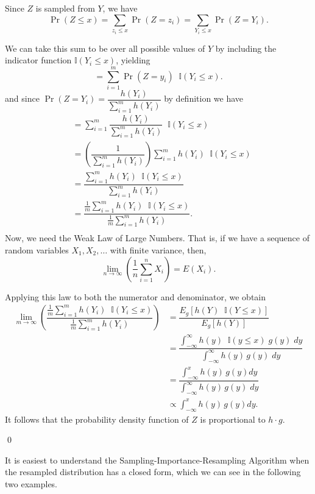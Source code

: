 \documentclass[12pt,twoside]{smiththesis}
\begin{document}
Since \(Z\) is sampled from \(Y\), we have
\[ \Pr(Z \leq x ) = \sum_{z_i \leq x} \Pr(Z=z_i) = \sum_{Y_i \leq x} \Pr(Z=Y_i) .\]

We can take this sum to be over all possible values of \(Y\) by including the indicator function \(\mathbb{I} (Y_i \leq x)\), yielding
\[  = \sum_{i = 1}^m \Pr(Z=y_i)\;\;\mathbb{I} (Y_i \leq x).  \]
and since \(\Pr(Z=Y_i) = \dfrac{h(Y_i)}{\sum_{i=1}^mh(Y_i) }\) by definition we have
\begin{align*} 
&= \sum_{i = 1}^m \dfrac{h(Y_i)}{\sum_{i=1}^mh(Y_i) }  \;\;\mathbb{I} (Y_i \leq x)   \\
&=  \left( \dfrac{1}{ {\sum_{i=1}^mh(Y_i) }} \right) {\sum_{i=1}^mh(Y_i) }  \;\;\mathbb{I} (Y_i \leq x)   \\
&=   \dfrac{ {\sum_{i=1}^mh(Y_i) }  \;\;\mathbb{I} (Y_i \leq x) }{\sum_{i=1}^mh(Y_i) } \\
&=   \dfrac{ \frac 1m {\sum_{i=1}^mh(Y_i) }  \;\;\mathbb{I} (Y_i \leq x) }{\frac 1m \sum_{i=1}^mh(Y_i) }. \\
\end{align*}
Now, we need the Weak Law of Large Numbers. That is, if we have a sequence of random variables \(X_1, X_2, \dots\) with finite variance, then,
\[ \lim_{n \to \infty} \left( \frac{1}{n} \sum_{i=1}^n X_i \right)  = E(X_i). \]

Applying this law to both the numerator and denominator, we obtain
\begin{align*}  \lim_{m \to \infty} \left( \dfrac{ \frac 1m {\sum_{i=1}^mh(Y_i) }  \;\;\mathbb{I} (Y_i \leq x) }{\frac 1m \sum_{i=1}^mh(Y_i) } \right) &= \dfrac{ E_g[ h(Y) \;\; \mathbb I (Y \leq x) ]  }{ E_g[ h(Y) ]  }\\
&= \dfrac{\int_{-\infty}^\infty h(y) \;\; \mathbb I (y \leq x) \; g(y) \; dy}{\int_{-\infty}^\infty h(y) \, g(y) \;dy}\\
&= \dfrac{\int_{-\infty}^x h(y) \, g(y) dy}{\int_{-\infty}^\infty h(y) \, g(y) \;dy}\\
&\propto \int_{-\infty}^x h(y) \, g(y) dy. 
\end{align*}
It follows that the probability density function of \(Z\) is proportional to \(h \cdot g\).

\vspace{3 mm}

\qed

It is easiest to understand the Sampling-Importance-Resampling Algorithm when the resampled distribution has a closed form, which we can see in the following two examples.
\end{document}
